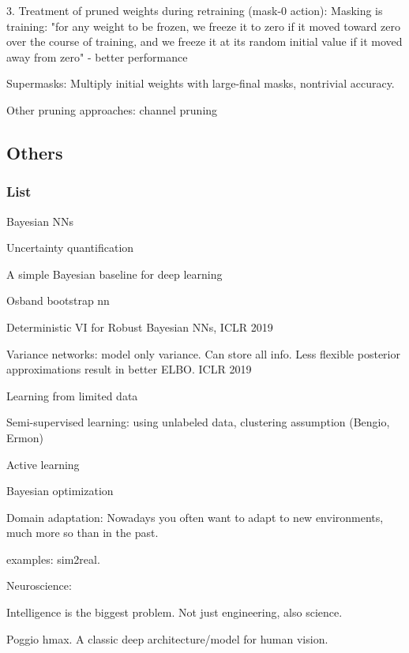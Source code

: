 \documentclass[english]{article}
\begin{document}
3. Treatment of pruned weights during
retraining (mask-0 action): Masking is training: "for any weight to be frozen, we freeze it to zero if it moved
toward zero over the course of training, and we freeze it at its random initial value if it moved away from zero" - better performance

Supermasks: Multiply initial weights with large-final masks, nontrivial accuracy. 

\item Other pruning approaches: channel pruning

\eenum


\subsection{Others}


\subsubsection{List}


\benum 


\item Bayesian NNs

Uncertainty quantification

A simple Bayesian baseline for deep learning

Osband bootstrap nn

Deterministic VI for Robust Bayesian NNs, ICLR 2019

Variance networks: model only variance. Can store all info. Less flexible posterior approximations result in better ELBO. ICLR 2019

\item Learning from limited data

 Semi-supervised learning: using unlabeled data, clustering assumption (Bengio, Ermon)

 Active learning

\item Bayesian optimization

\item Domain adaptation: Nowadays you often want to adapt to new environments, much more so than in the past. 

examples: sim2real. 

\item Neuroscience: 

Intelligence is the biggest problem. Not just engineering, also science. 

Poggio hmax. A classic deep architecture/model for human vision.
\end{document}
